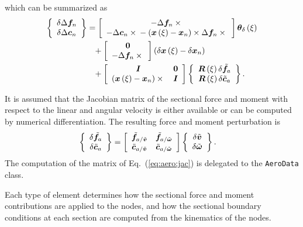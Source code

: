 which can be summarized as
\begin{align}
	\cubr{\cvvect{
		\delta\Delta\T{f}_n \\
		\delta\Delta\T{c}_n
	}}
	&=
	\sqbr{\cvvect{
		- \Delta\T{f}_n \times{} \\
		- \Delta\T{c}_n \times{}
		- \plbr{\T{x}\plbr{\xi} - \T{x}_n} \times \Delta\T{f}_n \times{}
	}} \T{\theta}_{\delta}\plbr{\xi}
	\nonumber \\
	& \hphantom{= } \mbox{}
	+ \sqbr{\cvvect{
		\TT{0} \\
		- \Delta\T{f}_n \times{}
	}} \plbr{
		\delta\T{x}\plbr{\xi}
		- \delta\T{x}_n
	}
	\nonumber \\
	& \hphantom{= } \mbox{}
	+ \sqbr{\matr{cc}{
		\TT{I} & \TT{0} \\
		\plbr{\T{x}\plbr{\xi} - \T{x}_n} \times{} & \TT{I}
	}} \cubr{\cvvect{
		\TT{R}\plbr{\xi} \delta\tilde{\T{f}}_a \\
		\TT{R}\plbr{\xi} \delta\tilde{\T{c}}_a
	}}
	.
\end{align}

It is assumed that the Jacobian matrix of the sectional force and moment
with respect to the linear and angular velocity
is either available or can be computed by numerical differentiation.
The resulting force and moment perturbation is
\begin{align}
	\cubr{\cvvect{
		\delta\tilde{\T{f}}_a \\
		\delta\tilde{\T{c}}_a
	}} &= \sqbr{\matr{cc}{
		\tilde{\T{f}}_{a/\tilde{\T{v}}} & \tilde{\T{f}}_{a/\tilde{\T{\omega}}} \\
		\tilde{\T{c}}_{a/\tilde{\T{v}}} & \tilde{\T{c}}_{a/\tilde{\T{\omega}}}
	}} \cubr{\cvvect{
		\delta\tilde{\T{v}} \\
		\delta\tilde{\T{\omega}}
	}}
	\label{eq:aero:jac}
	.
\end{align}
The computation of the matrix of Eq.~(\ref{eq:aero:jac})
is delegated to the \texttt{AeroData} class.

Each type of element determines how the sectional force and moment
contributions are applied to the nodes, and how the sectional
boundary conditions at each section are computed from the kinematics
of the nodes.



